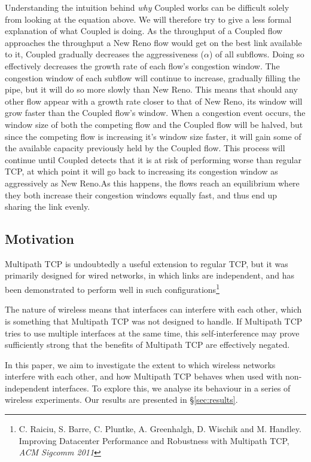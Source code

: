 Understanding the intuition behind \textit{why} Coupled works can be difficult
solely from looking at the equation above. We will therefore try to give a less formal
 explanation of what Coupled is doing. As the throughput of a Coupled
flow approaches the throughput a New Reno flow would get on the best link
available to it, Coupled gradually decreases the aggressiveness ($\alpha$)
of all subflows. Doing so effectively decreases the growth rate of each flow's
congestion window. The congestion window of each subflow will continue to increase,
gradually filling the pipe, but it will do so more slowly than New Reno. This means that
should any other flow appear with a growth rate closer to that of New Reno, its
window will grow faster than the Coupled flow's window. When a congestion event
occurs, the window size of both the competing flow and the Coupled
flow will be halved, but since the competing flow is increasing it's window size faster,
it will gain some of the available capacity previously held by the Coupled flow.
This process will continue until Coupled detects that it is at risk of
performing worse than regular TCP, at which point it will go back to increasing its
congestion window as aggressively as New Reno.\@ As this happens, the flows
reach an equilibrium where they both increase their congestion windows equally
fast, and thus end up sharing the link evenly.

\subsection{Motivation}
\label{sec:bg:motivation}
Multipath TCP is undoubtedly a useful extension to regular TCP, but it was
primarily designed for wired networks, in which links are independent, and
has been demonstrated to perform
well in such configurations\footnote{C. Raiciu, S. Barre, C. Pluntke, A. Greenhalgh, 
D. Wischik and M. Handley. Improving Datacenter Performance and Robustness with 
Multipath TCP, \textit{ACM Sigcomm 2011}}

The nature of wireless means that interfaces can interfere with each
other, which is something that Multipath TCP was not designed to handle.
If Multipath TCP
tries to use multiple interfaces at the same time, this self-interference may
prove sufficiently strong that the benefits of Multipath TCP are effectively
negated.

In this paper, we aim to investigate the extent to which wireless networks
interfere with each other, and how Multipath TCP behaves when used with
non-independent interfaces. To explore this, we analyse its behaviour in a
series of wireless experiments. Our results are presented in
\S\ref{sec:results}.
